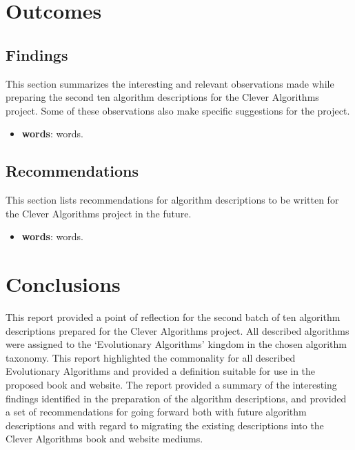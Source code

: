 \documentclass[a4paper, 11pt]{article}
\begin{document}
% 
% 
\section{Outcomes}
\label{sec:outcomes}

% 
% 
\subsection{Findings}
This section summarizes the interesting and relevant observations made while preparing the second ten algorithm descriptions for the Clever Algorithms project. Some of these observations also make specific suggestions for the project. 

\begin{itemize}
	\item \textbf{words}: words.
\end{itemize}


% 
% 
\subsection{Recommendations}
This section lists recommendations for algorithm descriptions to be written for the Clever Algorithms project in the future. 

\begin{itemize}
	\item \textbf{words}: words.
\end{itemize}

% 
% 
\section{Conclusions}
\label{sec:conclusions}
This report provided a point of reflection for the second batch of ten algorithm descriptions prepared for the Clever Algorithms project. All described algorithms were assigned to the `Evolutionary Algorithms' kingdom in the chosen algorithm taxonomy. This report highlighted the commonality for all described Evolutionary Algorithms and provided a definition suitable for use in the proposed book and website.
The report provided a summary of the interesting findings identified in the preparation of the algorithm descriptions, and provided a set of recommendations for going forward both with future algorithm descriptions and with regard to migrating the existing descriptions into the Clever Algorithms book and website mediums.



\end{document}

